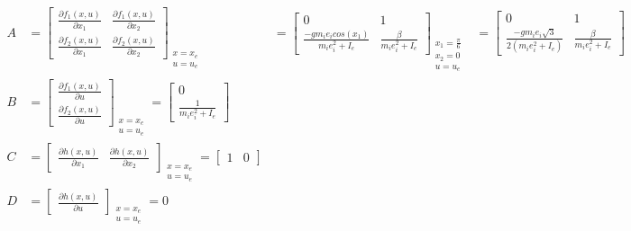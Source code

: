 \documentclass[a4paper, 11pt]{article}
\begin{document}
\begin{subequations}\label{eq:matrices}
\begin{align}
	A &= \begin{bmatrix}
	    \frac{\partial f_1(x,u)}{\partial x_1} & \frac{\partial f_1(x,u)}{\partial x_2} 
        \\ 
        \frac{\partial f_2(x,u)}{\partial x_1} & \frac{\partial f_2(x,u)}{\partial x_2} 
        \end{bmatrix}_{\substack{x=x_e \\ u = u_e}}
        &= \begin{bmatrix}
            0 & 1 
            \\ 
            \frac{-g m_i e_i cos(x_1)}{m_i e_i^2 + I_e} & \frac{\beta}{m_i e_i^2 + I_e}
        \end{bmatrix}_{\substack{x_1=\frac{\pi}{6} \\ x_2=0 \\  u=u_e}}
        &= \begin{bmatrix}
            0 & 1 
            \\ 
            \frac{-g m_i e_i \sqrt{3}}{2(m_i e_i^2 + I_e)} & \frac{\beta}{m_i e_i^2 + I_e}
        \end{bmatrix}
	\\
	B &= \begin{bmatrix} 
            \frac{\partial f_1(x,u)}{\partial u}
            \\ 
            \frac{\partial f_2(x,u)}{\partial u} \end{bmatrix}_{\substack{x=x_e \\ u=u_e}}
= \begin{bmatrix} 0 \\ \frac{1}{m_i e_i^2 + I_e} \end{bmatrix}
	\\
	C &= \begin{bmatrix} 
            \frac{\partial h(x,u)}{\partial x_1} & \frac{\partial h(x,u)}{\partial x_2} \end{bmatrix}_{\substack{x=x_e \\  u=u_e}}
=\begin{bmatrix} 1 & 0 \end{bmatrix}
	\\
	D &= \begin{bmatrix} \frac{\partial h(x,u)}{\partial u} \end{bmatrix}_{\substack{x=x_e \\ u=u_e}}
= 0
\end{align}
\end{subequations}
%
\end{document}
